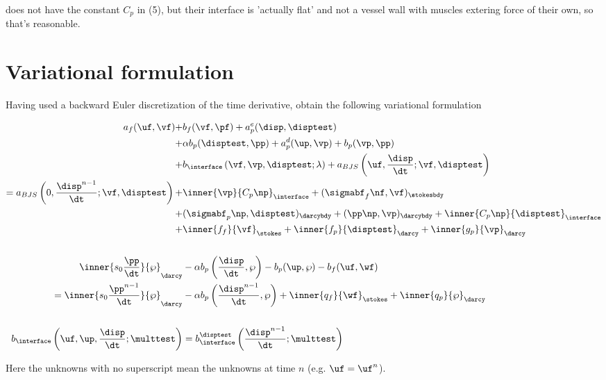 \documentclass{article}
\begin{document}
\cite{ambartsumyan} does not have the constant $C_p$ in (5), but their interface is 'actually flat' and not a vessel wall with muscles extering force of their own, so that's reasonable.


\section{Variational formulation}
Having used a backward Euler discretization of the time derivative, \cite{ambartsumyan} obtain the following variational formulation

\begin{subequations}
  \begin{align}
    a_f(\uf, \vf) +& b_f(\vf, \pf)  + a^e_p(\disp, \disptest) \label{eq:varform1} \\
    +&\alpha b_p(\disptest, \pp)  + a_p^d(\up, \vp) + b_p(\vp, \pp)  \nonumber \\
    + &b_{\interface}\left (\vf, \vp, \disptest; \lambda \right ) + a_{BJS}\left (\uf, \frac{\disp} {\dt}; \vf, \disptest \right)\nonumber \\
                   = a_{BJS}\left (0, \frac{\disp^{n-1}} {\dt}; \vf, \disptest \right) + & \inner{\vp}{C_p\np}_{\interface} + (\sigmabf_f\nf, \vf)_{\stokesbdy}  \nonumber \\
    + & (\sigmabf_p\np, \disptest)_{\darcybdy} + (\pp\np, \vp)_{\darcybdy} + \inner{C_p\np}{\disptest}_{\interface}\nonumber \\
    + & \inner{f_f}{\vf}_{\stokes} + \inner{f_p}{\disptest}_{\darcy}  + \inner{g_p}{\vp}_{\darcy}\nonumber \\ \nonumber \\ %
    \inner{s_0 \frac {\pp} {\dt}}{\wp}_{\darcy}  &- \alpha b_p\left ( \frac{\disp} {\dt}, \wp \right ) - b_p(\up, \wp) - b_f(\uf, \wf) \label{eq:varform2}
    \\ = \inner{s_0 \frac {\pp^{n-1}} {\dt}}{\wp}_{\darcy} &- \alpha b_p\left ( \frac {\disp^{n-1}} {\dt}, \wp \right )  + \inner{q_f}{\wf}_{\stokes} + \inner{q_p}{\wp}_{\darcy}  \nonumber \\ \nonumber \\
    b_{\interface}\left (\uf, \up, \frac {\disp} {\dt}; \multtest \right ) &= b^{\disptest}_{\interface}\left (\frac {\disp^{n-1}} {\dt}; \multtest \right ) \label{eq:varform3}
  \end{align}
\end{subequations}

Here the unknowns with no superscript mean the unknowns at time $n$ (e.g. $\uf = \uf^n$). 
\end{document}
